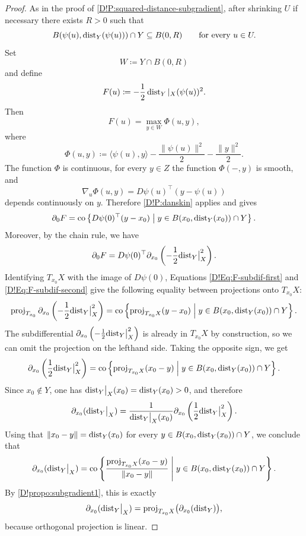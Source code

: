 \begin{proof}
  As in the proof of \cref{D!P:squared-distance-subgradient}, after shrinking $U$ if necessary there exists $R>0$ such that
  \[
    B(\psi(u),\operatorname{dist}_Y(\psi(u))) \cap Y \subseteq B(0,R)
    \qquad \text{for every } u \in U.
  \]
  Set
  \[
    W \coloneq Y \cap B(0,R)
  \]
  and define
  \[
    F(u)\coloneq -\frac{1}{2}\operatorname{dist}_Y{|_X}(\psi(u))^2.
  \]
  Then
  \[
    F(u)=\max_{y \in W}\Phi(u,y),
  \]
  where
  \[
    \Phi(u,y)\coloneq
    \langle \psi(u),y\rangle-\frac{\|\psi(u)\|^2}{2}-\frac{\|y\|^2}{2}.
  \]
  The function $\Phi$ is continuous, for every $y \in Z$ the function $\Phi(-,y)$ is smooth, and
  \[
    \nabla_u\Phi(u,y)=D\psi(u)^{\top}(y-\psi(u))
  \]
  depends continuously on $y$. Therefore \cref{D!P:danskin} applies and gives
  \begin{equation}
  \label{D!Eq:F-subdif-first}
    \partial_0F
    =
    \mathrm{co}\left\{
    D\psi(0)^{\top}(y-x_0)
    \;\middle|\;
    y \in B(x_0,\operatorname{dist}_Y(x_0)) \cap Y
    \right\}.
  \end{equation}
  Moreover, by the chain rule, we have
  \begin{equation}
  \label{D!Eq:F-subdif-second}
    \partial_0 F = D \psi(0)^\top \partial_{x_0} \left( -\frac{1}{2} \mathord{\operatorname{dist}}_Y\big|_X^2 \right).
  \end{equation}
  Identifying $T_{x_0} X$ with the image of $D \psi(0)$, Equations \eqref{D!Eq:F-subdif-first} and \eqref{D!Eq:F-subdif-second} give the following equality between projections onto $T_{x_0} X$:
  \[
    \operatorname{proj}_{T_{x_0}} \partial_{x_0} \left( -\frac{1}{2} \mathord{\operatorname{dist}}_Y\big|_X^2 \right) = \mathrm{co} \left\{
    \mathrm{proj}_{T_{x_0}X} (y - x_0)
    \;\middle|\;
    y \in B(x_0, \operatorname{dist}_Y(x_0)) \cap Y
    \right\}.
  \]
  The subdifferential $\partial_{x_0} \left( -\frac{1}{2} \mathord{\operatorname{dist}}_Y\big|_X^2 \right)$ is already in $T_{x_0} X$ by construction, so we can omit the projection on the lefthand side. Taking the opposite sign, we get
  \[
    \partial_{x_0}\left(\frac{1}{2}\mathord{\operatorname{dist}}_Y\big|_X^2\right)
    =
    \mathrm{co}\left\{
    \mathrm{proj}_{T_{x_0}X}(x_0-y)
    \;\middle|\;
    y \in B(x_0,\operatorname{dist}_Y(x_0)) \cap Y
    \right\}.
  \]
  Since $x_0 \notin Y$, one has $\mathord{\operatorname{dist}}_Y\big|_X(x_0)=\operatorname{dist}_Y(x_0)>0$, and therefore
  \[
    \partial_{x_0}(\mathord{\operatorname{dist}}_Y\big|_X)
    =
    \frac{1}{\mathord{\operatorname{dist}}_Y\big|_X(x_0)}
    \partial_{x_0}\left(\frac{1}{2}\mathord{\operatorname{dist}}_Y\big|_X^2\right).
  \]
  Using that $\|x_0-y\|=\operatorname{dist}_Y(x_0)$ for every $y \in B(x_0,\operatorname{dist}_Y(x_0)) \cap Y$, we conclude that
  \[
    \partial_{x_0}(\mathord{\operatorname{dist}}_Y\big|_X)
    =
    \mathrm{co}\left\{
    \frac{\mathrm{proj}_{T_{x_0}X}(x_0-y)}{\|x_0-y\|}
    \;\middle|\;
    y \in B(x_0,\operatorname{dist}_Y(x_0)) \cap Y
    \right\}.
  \]
  By \cref{D!propo:subgradient1}, this is exactly
  \[
    \partial_{x_0}(\mathord{\operatorname{dist}}_Y\big|_X)=\mathrm{proj}_{T_{x_0}X}\bigl(\partial_{x_0}(\operatorname{dist}_Y)\bigr),
  \]
  because orthogonal projection is linear.
\end{proof}

